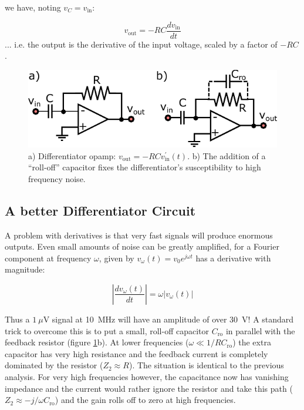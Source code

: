\documentclass{tufte-book}
\begin{document}
we have, noting $v_C = v_\text{in}$:

\begin{equation}
\label{eq:opamp_differentiator}
v_\text{out} = -RC\frac{dv_\text{in}}{dt}
\end{equation}
\noindent ... i.e. the output is the derivative of the input voltage, scaled by a factor of $-RC$.

\begin{figure}[ht]
\caption{a) Differentiator opamp: $v_\text{out} = -RCv_\text{in}^\prime(t)$. b) The addition of a ``roll-off'' capacitor fixes the differentiator's susceptibility to high frequency noise.}
\label{fig:differentiator_opamp}
	\begin{center}
		\includegraphics[]{Images/differentiator_opamp.pdf}
	\end{center}
\end{figure}
\subsection{A better Differentiator Circuit}
A problem with derivatives is that very fast signals will produce enormous outputs. Even small amounts of noise can be greatly amplified, for a Fourier component at frequency $\omega$, given by $v_\omega(t) = v_0e^{j\omega t}$ has a derivative with magnitude:

$$
\left\vert\frac{dv_\omega(t)}{dt}\right\vert = \omega \vert v_\omega(t)\vert
$$

Thus a $1~\mu$V signal at 10~MHz will have an amplitude of over 30~V! A standard trick to overcome this is to put a small, roll-off capacitor $C_\text{ro}$ in parallel with the feedback resistor (figure \ref{fig:differentiator_opamp}b). At lower frequencies ($\omega \ll 1/RC_\text{ro}$) the extra capacitor has very high resistance and the feedback current is completely dominated by the resistor ($Z_2 \approx R$). The situation is identical to the previous analysis. For very high frequencies however, the capacitance now has vanishing impedance and the current would rather ignore the resistor and take this path ($Z_2\approx -j/\omega C_\text{ro}$) and the gain rolls off to zero at high frequencies.
\end{document}
